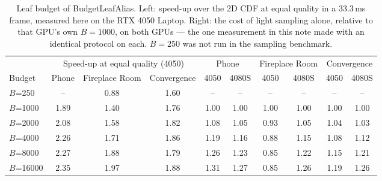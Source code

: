 \begin{table}[H]
\centering\small
\setlength{\tabcolsep}{4pt}
\caption{Leaf budget of BudgetLeafAlias. Left: speed-up over the 2D CDF at equal quality in a 33.3\,ms frame, measured here on the RTX 4050 Laptop. Right: the cost of light sampling alone, relative to that GPU's own $B=1000$, on both GPUs --- the one measurement in this note made with an identical protocol on each. $B=250$ was not run in the sampling benchmark.}
\label{tab:leaves}
\begin{tabular}{l ccc cc cc cc}
\toprule
 & \multicolumn{3}{c}{Speed-up at equal quality (4050)} & \multicolumn{2}{c}{Phone} & \multicolumn{2}{c}{Fireplace Room} & \multicolumn{2}{c}{Convergence} \\
\cmidrule(lr){2-4}\cmidrule(lr){5-6}\cmidrule(lr){7-8}\cmidrule(lr){9-10}
Budget & Phone & Fireplace Room & Convergence & 4050 & 4080S & 4050 & 4080S & 4050 & 4080S \\
\midrule
$B$=250 & -- & 0.88 & 1.60 & -- & -- & -- & -- & -- & -- \\
$B$=1000 & 1.89 & 1.40 & 1.76 & 1.00 & 1.00 & 1.00 & 1.00 & 1.00 & 1.00 \\
$B$=2000 & 2.08 & 1.58 & 1.82 & 1.08 & 1.05 & 0.93 & 1.05 & 1.04 & 1.03 \\
$B$=4000 & 2.26 & 1.71 & 1.86 & 1.19 & 1.16 & 0.88 & 1.15 & 1.08 & 1.12 \\
$B$=8000 & 2.27 & 1.88 & 1.79 & 1.26 & 1.23 & 0.85 & 1.22 & 1.15 & 1.21 \\
$B$=16000 & 2.35 & 1.97 & 1.88 & 1.31 & 1.27 & 0.85 & 1.26 & 1.19 & 1.26 \\
\bottomrule
\end{tabular}
\end{table}
